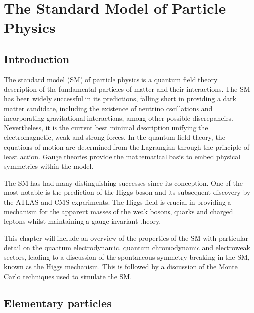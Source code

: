 \chapter{The Standard Model of Particle Physics}
\label{chap:theory}


\section{Introduction}

The standard model (SM) of particle physics is a quantum field theory description of the fundamental particles of matter and their interactions. The SM has been widely successful in its predictions, falling short in providing a dark matter candidate, including the existence of neutrino oscillations and incorporating gravitational interactions, among other possible discrepancies.  Nevertheless, it is the current best minimal description unifying the electromagnetic, weak and strong forces. In the quantum field theory, the equations of motion are determined from the Lagrangian through the principle of least action. Gauge theories provide the mathematical basis to embed physical symmetries within the model.

The SM has had many distinguishing successes since its conception. One of the most notable is the prediction of the Higgs boson \cite{PhysRevLett.13.321,PhysRevLett.13.508,PhysRevLett.13.585} and its subsequent discovery by the ATLAS \cite{Aad:2012tfa} and CMS \cite{Chatrchyan:2012xdj} experiments. The Higgs field is crucial in providing a mechanism for the apparent masses of the weak bosons, quarks and charged leptons whilst maintaining a gauge invariant theory.

This chapter will include an overview of the properties of the SM with particular detail on the quantum electrodynamic, quantum chromodynamic and electroweak sectors, leading to a discussion of the spontaneous symmetry breaking in the SM, known as the Higgs mechanism. This is followed by a discussion of the Monte Carlo techniques used to simulate the SM.


\section{Elementary particles}

